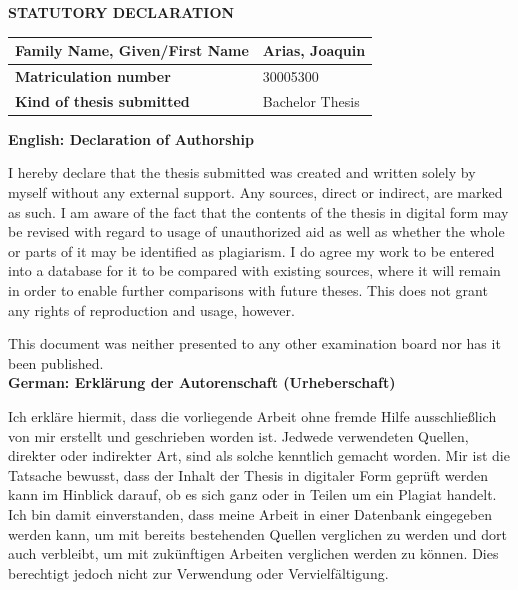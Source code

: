\documentclass[12pt]{article}
\begin{document}
\thispagestyle{fancy}

\newpage
\vspace{1cm}

\begin{center}
    \textbf{STATUTORY DECLARATION}
\end{center}
\noindent
\begin{tabular}{|p{}|p{}|}
    \hline
    \textbf{Family Name, Given/First Name} & Arias, Joaquin \\
    \hline
    \textbf{Matriculation number} & 30005300 \\
    \hline
    \textbf{Kind of thesis submitted} & Bachelor Thesis \\
    \hline
\end{tabular}


\vspace{1cm}

\noindent\textbf{English: Declaration of Authorship}

\vspace{0.5cm}

\noindent I hereby declare that the thesis submitted was created and written solely by myself without any external support. Any sources, direct or indirect, are marked as such. I am aware of the fact that the contents of the thesis in digital form may be revised with regard to usage of unauthorized aid as well as whether the whole or parts of it may be identified as plagiarism. I do agree my work to be entered into a database for it to be compared with existing sources, where it will remain in order to enable further comparisons with future theses. This does not grant any rights of reproduction and usage, however.

\noindent This document was neither presented to any other examination board nor has it been published.
\\

\noindent\textbf{German: Erklärung der Autorenschaft (Urheberschaft)}

\vspace{0.5cm}

\noindent Ich erkläre hiermit, dass die vorliegende Arbeit ohne fremde Hilfe ausschließlich von mir erstellt und geschrieben worden ist. Jedwede verwendeten Quellen, direkter oder indirekter Art, sind als solche kenntlich gemacht worden. Mir ist die Tatsache bewusst, dass der Inhalt der Thesis in digitaler Form geprüft werden kann im Hinblick darauf, ob es sich ganz oder in Teilen um ein Plagiat handelt. Ich bin damit einverstanden, dass meine Arbeit in einer Datenbank eingegeben werden kann, um mit bereits bestehenden Quellen verglichen zu werden und dort auch verbleibt, um mit zukünftigen Arbeiten verglichen werden zu können. Dies berechtigt jedoch nicht zur Verwendung oder Vervielfältigung.
\end{document}
